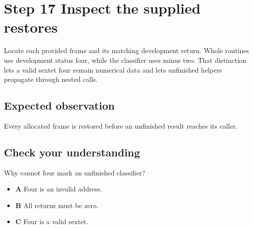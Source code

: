 \section{Step 17 Inspect the supplied restores}\label{base64-s17}

Locate each provided frame and its matching development return. Whole routines use development status four, while the classifier uses minus two. That distinction lets a valid sextet four remain numerical data and lets unfinished helpers propagate through nested calls.

\subsection{Expected observation}
Every allocated frame is restored before an unfinished result reaches its caller.

\subsection{Check your understanding}
Why cannot four mark an unfinished classifier?

\begin{itemize}
  \item \textbf{A} Four is an invalid address.
  \item \textbf{B} All returns must be zero.
  \item \textbf{C} Four is a valid sextet.
\end{itemize}
